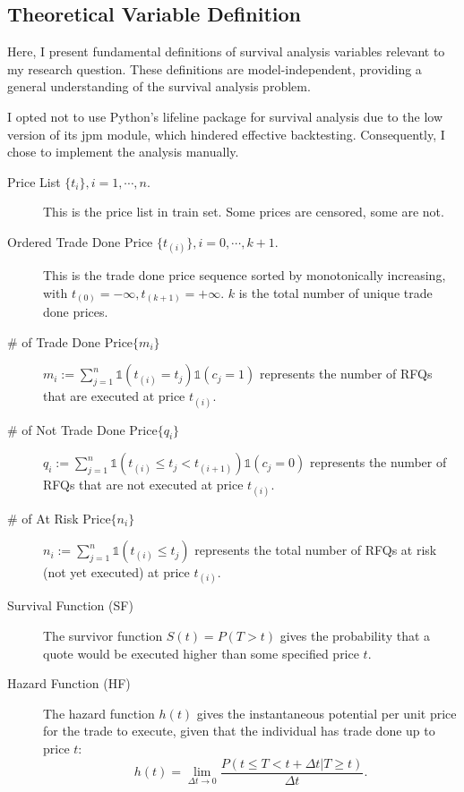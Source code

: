 \subsection{Theoretical Variable Definition}
Here, I present fundamental definitions of survival analysis variables relevant to my research question. These definitions are model-independent, providing a general understanding of the survival analysis problem.

I opted not to use Python's lifeline package for survival analysis due to the low version of its jpm module, which hindered effective backtesting. Consequently, I chose to implement the analysis manually.

\begin{description}
    \item[Price List $\{t_i\}, i = 1, \cdots, n.$] This is the price list in train set. Some prices are censored, some are not.
    
    \item[Ordered Trade Done Price $\{t_{(i)}\}, i = 0, \cdots, k + 1.$ ] This is the trade done price sequence sorted by monotonically increasing, with $t_{(0)} = -\infty, t_{(k+1)} = +\infty$. $k$ is the total number of unique trade done prices.
    
    \item[\# of Trade Done Price$\{m_i\}$] $m_i := \sum_{j = 1}^{n} \mathds{1}(t_{(i)} = t_j) \mathds{1}(c_j = 1) $ represents the number of RFQs that are executed at price $t_{(i)}$. %
    
    \item[\# of Not Trade Done Price$\{q_i\}$] $q_i := \sum_{j = 1}^{n} \mathds{1}(t_{(i)} \leqslant t_j < t_{(i + 1)}) \mathds{1}(c_j = 0)$ represents the number of RFQs that are not executed at price $t_{(i)}$. %
    
    \item[\# of At Risk Price$\{n_i\}$] $n_i:= \sum_{j = 1}^{n} \mathds{1}(t_{(i)} \leqslant t_j)  $ represents the total number of RFQs at risk (not yet executed) at price $t_{(i)}$. %
    
    \item[Survival Function (SF)] The survivor function $S(t) = P(T > t)$ gives the probability that a quote would be executed higher than some specified price $t$.
    
    \item[Hazard Function (HF)] The hazard function $h(t)$ gives the instantaneous potential per unit price for the trade to execute, given that the individual has trade done up to price $t$:
    \[
        h(t) = \lim_{\Delta t \to 0} \frac{P(t \leqslant T < t + \Delta t| T \geqslant t)}{\Delta t}.
    \]


\end{description}
